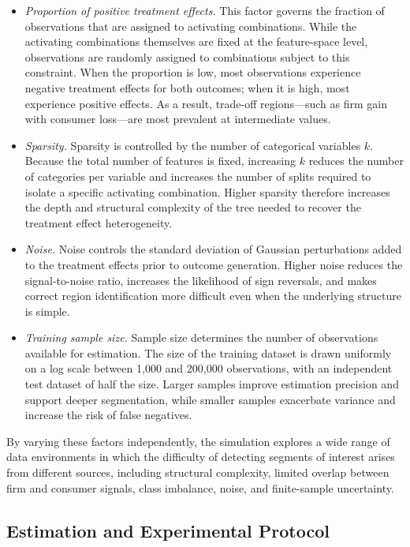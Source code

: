 \documentclass[11pt,letterpaper,english]{article}
\theoremstyle{definition}
\theoremstyle{definition}
\begin{document}
\begin{bibunit}
\begin{itemize}
    \item \emph{Proportion of positive treatment effects.}  
    This factor governs the fraction of observations that are assigned to activating combinations. While the activating combinations themselves are fixed at the feature-space level, observations are randomly assigned to combinations subject to this constraint. When the proportion is low, most observations experience negative treatment effects for both outcomes; when it is high, most experience positive effects. As a result, trade-off regions—such as firm gain with consumer loss—are most prevalent at intermediate values.

    \item \emph{Sparsity.}  
    Sparsity is controlled by the number of categorical variables $k$. Because the total number of features is fixed, increasing $k$ reduces the number of categories per variable and increases the number of splits required to isolate a specific activating combination. Higher sparsity therefore increases the depth and structural complexity of the tree needed to recover the treatment effect heterogeneity.

    \item \emph{Noise.}  
    Noise controls the standard deviation of Gaussian perturbations added to the treatment effects prior to outcome generation. Higher noise reduces the signal-to-noise ratio, increases the likelihood of sign reversals, and makes correct region identification more difficult even when the underlying structure is simple.

    \item \emph{Training sample size.}  
    Sample size determines the number of observations available for estimation. The size of the training dataset is drawn uniformly on a log scale between 1{,}000 and 200{,}000 observations, with an independent test dataset of half the size. Larger samples improve estimation precision and support deeper segmentation, while smaller samples exacerbate variance and increase the risk of false negatives.
\end{itemize}

By varying these factors independently, the simulation explores a wide range of data environments in which the difficulty of detecting segments of interest arises from different sources, including structural complexity, limited overlap between firm and consumer signals, class imbalance, noise, and finite-sample uncertainty.


\subsection{Estimation and Experimental Protocol}
\label{sec:estimation-protocol}


\end{bibunit}
\end{document}
